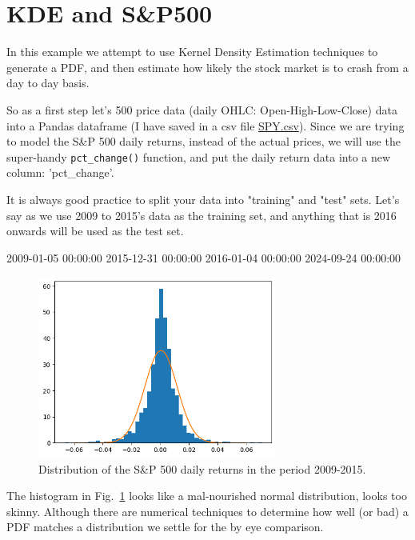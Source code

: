 \section{KDE and S\&P500}

In this example we attempt to use Kernel Density Estimation techniques to generate a PDF, and then estimate how likely the stock market is to crash from a day to day basis.

So as a first step let's 500 price data (daily OHLC: Open-High-Low-Close) data into a Pandas dataframe
(I have saved in a csv file \href{https://raw.githubusercontent.com/matteosan1/finance_course/refs/heads/develop/input_files/SPX.csv}{SPY.csv}). 
Since we are trying to model the S\&P 500 daily returns, instead of the actual prices, we will use the super-handy \texttt{pct\_change()} function, and put the daily return data into a new column: 'pct\_change'.

It is always good practice to split your data into "training" and "test" sets. Let's say as we use 2009 to 2015's data as the training set, and anything that is 2016 onwards will be used as the test set.

\begin{ioutput}
2009-01-05 00:00:00 2015-12-31 00:00:00 2016-01-04 00:00:00 2024-09-24 00:00:00
\end{ioutput}

\begin{figure}[htb]
\centering
\includegraphics[width=0.7\textwidth]{figures/spy_distro}
\caption{Distribution of the S\&P 500 daily returns in the period 2009-2015.}
\label{fig:spy_distro}
\end{figure}

The histogram in Fig.~\ref{fig:spy_distro} looks like a mal-nourished normal distribution, looks too skinny. Although there are numerical techniques to determine how well (or bad) a PDF matches a distribution we settle for the by eye comparison.

